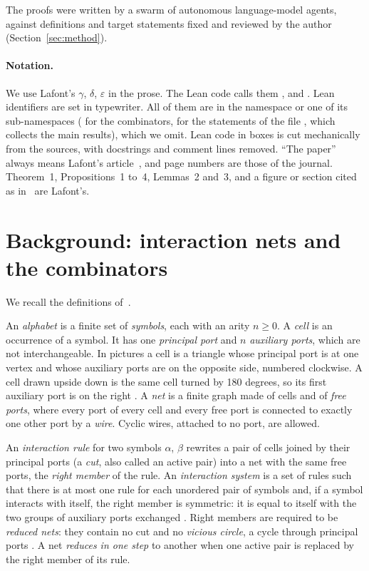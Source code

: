 \documentclass[11pt,a4paper]{article}
\newcommand{\pp}[1]{\cite[#1]{lafont1997}}
\begin{document}
The proofs were written by a swarm of autonomous language-model agents, against definitions and
target statements fixed and reviewed by the author (Section~\ref{sec:method}).

\paragraph{Notation.}
We use Lafont's $\gamma$, $\delta$, $\varepsilon$ in the prose. The Lean code calls them
,  and . Lean identifiers are set in typewriter. All of them are in
the namespace  or one of its sub-namespaces ( for the combinators,
 for the statements of the file , which collects the main
results), which we omit. Lean code in boxes is cut mechanically from the sources, with
docstrings and comment lines removed. ``The paper'' always means Lafont's
article~\cite{lafont1997}, and page numbers are those of the journal. Theorem~1,
Propositions~1 to~4, Lemmas~2 and~3, and a figure or section cited as in~\pp{Fig.~7} are
Lafont's.

\section{Background: interaction nets and the combinators}
\label{sec:background}

We recall the definitions of~\cite[Section~1]{lafont1997}.

An \emph{alphabet} is a finite set of \emph{symbols}, each with an arity $n \ge 0$. A \emph{cell} is an occurrence of a symbol. It has one
\emph{principal port} and $n$ \emph{auxiliary ports}, which are not interchangeable. In pictures
a cell is a triangle whose principal port is at one vertex and whose auxiliary ports are on the
opposite side, numbered clockwise. A cell drawn upside down is the same cell turned by 180
degrees, so its first auxiliary port is on the right \pp{p.~71}. A \emph{net} is a finite graph
made of cells and of \emph{free ports}, where every port of every cell and every free port is
connected to exactly one other port by a \emph{wire}. Cyclic wires, attached to no port, are
allowed.

An \emph{interaction rule} for two symbols $\alpha$, $\beta$ rewrites a pair of cells joined by
their principal ports (a \emph{cut}, also called an active pair) into a net with the same free
ports, the \emph{right member} of the rule. An \emph{interaction system} is a set of rules such
that there is at most one rule for each unordered pair of symbols and, if a symbol interacts
with itself, the right member is symmetric: it is equal to itself with the two groups of
auxiliary ports exchanged \pp{p.~73}. Right members are required to be \emph{reduced nets}:
they contain no cut and no \emph{vicious circle}, a cycle through principal ports
\pp{p.~79}. A net \emph{reduces in one
step} to another when one active pair is replaced by the right member of its rule.
\end{document}

